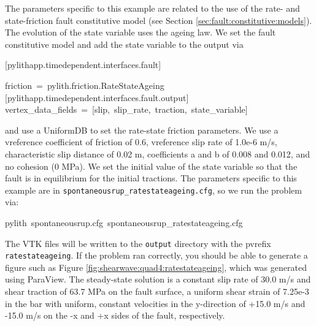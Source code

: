 The parameters specific to this example are related to the use of
the rate- and state-friction fault constitutive model (see Section
\vref{sec:fault:constitutive:models}). The evolution of the state
variable uses the ageing law. We set the fault constitutive model
and add the state variable to the output via
\begin{lyxcode}
{[}pylithapp.timedependent.interfaces.fault{]}

friction~=~pylith.friction.RateStateAgeing~\\


{[}pylithapp.timedependent.interfaces.fault.output{]}~\\
vertex\_data\_fields~=~{[}slip,~slip\_rate,~traction,~state\_variable{]}~
\end{lyxcode}
and use a UniformDB to set the rate-state friction parameters. We
use a vreference coefficient of friction of 0.6, vreference slip rate
of 1.0e-6 m/s, characteristic slip distance of 0.02 m, coefficients
a and b of 0.008 and 0.012, and no cohesion (0 MPa). We set the initial
value of the state variable so that the fault is in equilibrium for
the initial tractions. The parameters specific to this example are
in \texttt{spontaneousrup\_ratestateageing.cfg}, so we run the problem
via:
\begin{lyxcode}
pylith~spontaneousrup.cfg~spontaneousrup\_ratestateageing.cfg
\end{lyxcode}
The VTK files will be written to the \texttt{output} directory with
the pvrefix \texttt{ratestateageing}. If the problem ran correctly,
you should be able to generate a figure such as Figure \vref{fig:shearwave:quad4:ratestateageing},
which was generated using ParaView. The steady-state solution is a
constant slip rate of 30.0 m/s and shear traction of 63.7 MPa on the
fault surface, a uniform shear strain of 7.25e-3 in the bar with uniform,
constant velocities in the y-direction of +15.0 m/s and -15.0 m/s
on the -x and +x sides of the fault, respectively.

